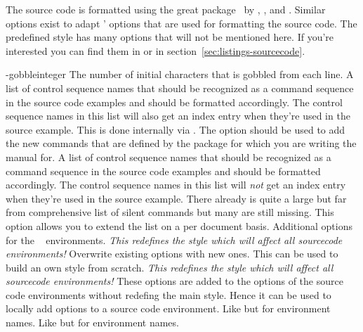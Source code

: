 \documentclass[load-preamble+,babel-options={ngerman,english}]{cnltx-doc}
\newcommand*\file[1]{\code{#1}}
\begin{document}
The source code is formatted using the great 
package~\cite{pkg:listings} by \heinz, \moses, and \hoffmann.  Similar options
exist to adapt ' options that are used for formatting the source
code.  The predefined style has many options that will not be mentioned here.
If you're interested you can find them in \file{cnltx-example.sty} or in
section~\vref{sec:listings-sourcecode}.
\begin{options}
  \keyval-{gobble}{integer}
    The number of initial characters that is gobbled from each line.
  \Default
    A list of control sequence names that should be recognized as a command
    sequence in the source code examples and should be formatted accordingly.
    The control sequence names in this list will also get an index entry when
    they're used in the source example.  This is done internally via
    .  The option should be used to add the new commands that are
    defined by the package for which you are writing the manual for.
    A list of control sequence names that should be recognized as a command
    sequence in the source code examples and should be formatted accordingly.
    The control sequence names in this list will \emph{not} get an index entry
    when they're used in the source example.  There already is quite a large
    but far from comprehensive list of silent commands but many are still
    missing.  This option allows you to extend the list on a per document
    basis.
  \Default
    Additional options for the ~\cite{pkg:listings}
    environments.  \emph{This redefines the   style
      which will affect all sourcecode environments!}
    Overwrite existing options with new ones.  This can be used to build an own
    style from scratch.  \emph{This redefines the  
      style which will affect all sourcecode environments!}
    These options are added to the  options of
    the source code environments without redefing the main style.  Hence it
    can be used to locally add options to a source code environment.
  \Default
    Like  but for environment names.
    Like  but for environment names.
\end{options}
\end{document}
